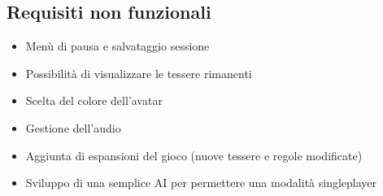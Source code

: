 \subsection*{Requisiti non funzionali}
\begin{itemize}
\item Menù di pausa e salvataggio sessione
\end{itemize}
\begin{itemize}
\item Possibilità di visualizzare le tessere rimanenti
\end{itemize}
\begin{itemize}
\item Scelta del colore dell’avatar
\end{itemize}
\begin{itemize}
\item Gestione dell’audio
\end{itemize}
\begin{itemize}
\item Aggiunta di espansioni del gioco (nuove tessere e regole modificate)
\end{itemize}
\begin{itemize}
\item Sviluppo di una semplice AI per permettere una modalità singleplayer
\end{itemize}


